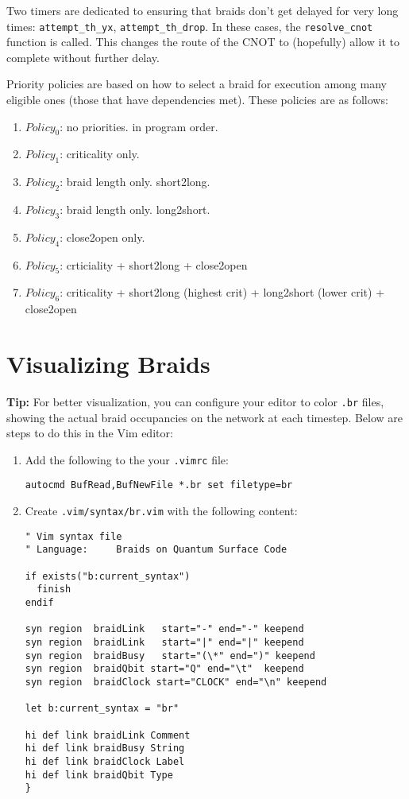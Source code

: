 \documentclass{article}
\begin{document}
Two timers are dedicated to ensuring that braids don't get delayed for very long times: {\tt attempt\_th\_yx}, {\tt attempt\_th\_drop}. 
In these cases, the {\tt resolve\_cnot} function is called. This changes the route of the CNOT to (hopefully) allow it to complete without further delay.

Priority policies are based on how to select a braid for execution among many eligible ones (those that have dependencies met). These policies are as follows:
\begin{enumerate}
\item $Policy_0$: no priorities. in program order.
\item $Policy_1$: criticality only.
\item $Policy_2$: braid length only. short2long.
\item $Policy_3$: braid length only. long2short.
\item $Policy_4$: close2open only.
\item $Policy_5$: crticiality + short2long + close2open
\item $Policy_6$: criticality + short2long (highest crit) + long2short (lower crit) + close2open
\end{enumerate}


\section{Visualizing Braids}

{\bf Tip:} For better visualization, you can configure your editor to color {\tt .br} files, showing the actual braid occupancies on the network at each timestep. Below are steps to do this in the Vim editor:
\begin{enumerate}
\item Add the following to the your {\tt .vimrc} file:

{\tt autocmd BufRead,BufNewFile  *.br set filetype=br}

\item Create {\tt .vim/syntax/br.vim} with the following content:

\begin{verbatim}
" Vim syntax file
" Language:     Braids on Quantum Surface Code

if exists("b:current_syntax")
  finish
endif

syn region	braidLink	start="-" end="-" keepend
syn region	braidLink	start="|" end="|" keepend
syn region	braidBusy	start="(\*" end=")" keepend
syn region  braidQbit start="Q" end="\t"  keepend
syn region  braidClock start="CLOCK" end="\n" keepend

let b:current_syntax = "br"

hi def link braidLink Comment
hi def link braidBusy String
hi def link braidClock Label
hi def link braidQbit Type
}
\end{verbatim}
\end{enumerate}
\end{document}
